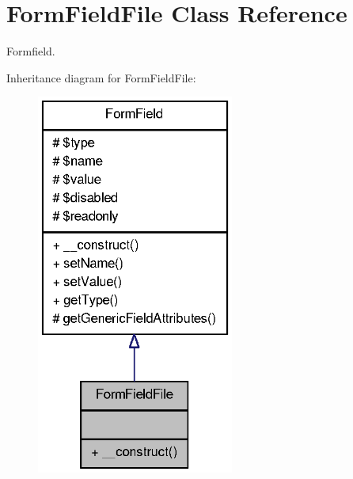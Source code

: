 \section{FormFieldFile Class Reference}
\label{classFormFieldFile}


Formfield.  




Inheritance diagram for FormFieldFile:\nopagebreak
\begin{figure}[H]
\begin{center}
\leavevmode
\includegraphics[width=184pt]{classFormFieldFile__inherit__graph}
\end{center}
\end{figure}


